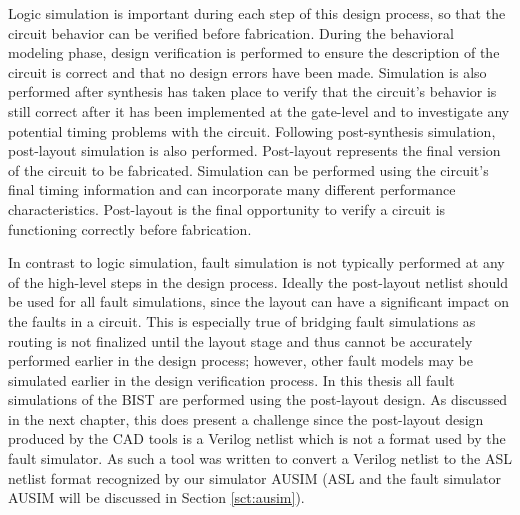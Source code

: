 \documentclass[12pt]{report}
\begin{document}
Logic simulation is important during each step of this design process, so that the circuit behavior can be verified before fabrication\cite{advancedverilog}.  During the behavioral modeling phase, design verification is performed to ensure the description of the circuit is correct and that no design errors have been made.  Simulation is also performed after synthesis has taken place to verify that the circuit's behavior is still correct after it has been implemented at the gate-level and to investigate any potential timing problems with the circuit\cite{advancedverilog}.  Following post-synthesis simulation, post-layout simulation is also performed.  Post-layout represents the final version of the circuit to be fabricated.  Simulation can be performed using the circuit's final timing information and can incorporate many different performance characteristics.  Post-layout is the final opportunity to verify a circuit is functioning correctly before fabrication\cite{advancedverilog}.

In contrast to logic simulation, fault simulation is not typically performed at any of the high-level steps in the design process\cite{stroud}.  Ideally the post-layout netlist should be used for all fault simulations, since the layout can have a significant impact on the faults in a circuit\cite{defectforcmos}.  This is especially true of bridging fault simulations as routing is not finalized until the layout stage and thus cannot be accurately performed earlier in the design process\cite{defectforcmos}; however, other fault models may be simulated earlier in the design verification process\cite{stroud}.  In this thesis all fault simulations of the BIST are performed using the post-layout design.  As discussed in the next chapter, this does present a challenge since the post-layout design produced by the CAD tools is a Verilog netlist which is not a format used by the fault simulator.  As such a tool was written to convert a Verilog netlist to the ASL netlist format recognized by our simulator AUSIM (ASL and the fault simulator AUSIM will be discussed in Section \ref{sct:ausim}).
\end{document}
